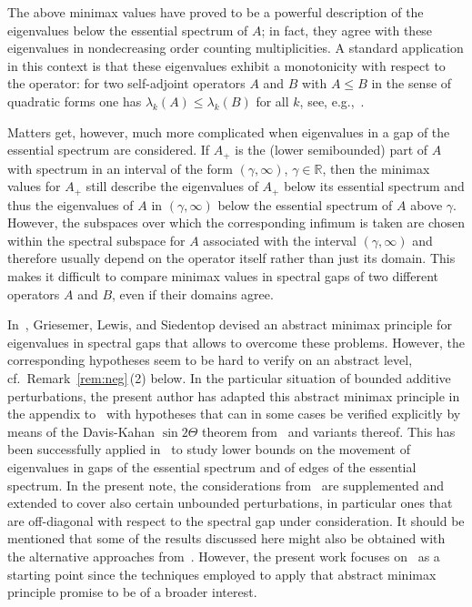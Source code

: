 \documentclass[11pt,a4paper]{amsart}
\numberwithin{equation}{section}
\newcommand{\R}{\mathbb{R}}
\theoremstyle{plain}
\theoremstyle{definition}
\theoremstyle{remark}
\begin{document}
The above minimax values have proved to be a powerful description of the eigenvalues below the essential spectrum of $A$; in
fact, they agree with these eigenvalues in nondecreasing order counting multiplicities. A standard application in this context is
that these eigenvalues exhibit a monotonicity with respect to the operator: for two self-adjoint operators $A$ and $B$ with
$A\le B$ in the sense of quadratic forms one has $\lambda_k(A) \le \lambda_k(B)$ for all $k$, see,
e.g.,~\cite[Corollary~12.3]{Schm12}.

Matters get, however, much more complicated when eigenvalues in a gap of the essential spectrum are considered. If $A_+$ is the
(lower semibounded) part of $A$ with spectrum in an interval of the form $(\gamma,\infty)$, $\gamma\in\R$, then the minimax
values for $A_+$ still describe the eigenvalues of $A_+$ below its essential spectrum and thus the eigenvalues of $A$ in
$(\gamma, \infty)$ below the essential spectrum of $A$ above $\gamma$. However, the subspaces over which the corresponding
infimum is taken are chosen within the spectral subspace for $A$ associated with the interval $(\gamma,\infty)$ and therefore
usually depend on the operator itself rather than just its domain. This makes it difficult to compare minimax values in spectral
gaps of two different operators $A$ and $B$, even if their domains agree.

In~\cite{GLS99}, Griesemer, Lewis, and Siedentop devised an abstract minimax principle for eigenvalues in spectral gaps that
allows to overcome these problems. However, the corresponding hypotheses seem to be hard to verify on an abstract level,
cf.~Remark~\ref{rem:neg}\,(2) below. In the particular situation of bounded additive perturbations, the present author has
adapted this abstract minimax principle in the appendix to~\cite{NSTTV18} with hypotheses that can in some cases be verified
explicitly by means of the Davis-Kahan $\sin2\Theta$ theorem from~\cite{DK70} and variants thereof. This has been successfully
applied in~\cite{NSTTV18} to study lower bounds on the movement of eigenvalues in gaps of the essential spectrum and of edges of
the essential spectrum. In the present note, the considerations from~\cite[Appendix~A]{NSTTV18} are supplemented and extended to
cover also certain unbounded perturbations, in particular ones that are off-diagonal with respect to the spectral gap under
consideration. It should be mentioned that some of the results discussed here might also be obtained with the alternative
approaches from~\cite{DES00, DES06, MM15, LS16}. However, the present work focuses on~\cite{GLS99} as a starting point since the
techniques employed to apply that abstract minimax principle promise to be of a broader interest.
\end{document}
